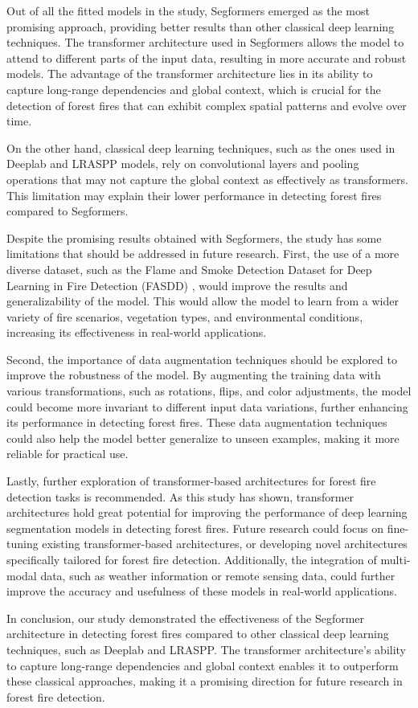 Out of all the fitted models in the study, Segformers \cite{xie_segformer_2021} emerged as the most promising approach, providing better results than other classical deep learning techniques. The transformer architecture used in Segformers allows the model to attend to different parts of the input data, resulting in more accurate and robust models. The advantage of the transformer architecture lies in its ability to capture long-range dependencies and global context, which is crucial for the detection of forest fires that can exhibit complex spatial patterns and evolve over time.

On the other hand, classical deep learning techniques, such as the ones used in Deeplab \cite{chen_rethinking_2017} and LRASPP \cite{howard2019searching} models, rely on convolutional layers and pooling operations that may not capture the global context as effectively as transformers. This limitation may explain their lower performance in detecting forest fires compared to Segformers.

Despite the promising results obtained with Segformers, the study has some limitations that should be addressed in future research. First, the use of a more diverse dataset, such as the Flame and Smoke Detection Dataset for Deep Learning in Fire Detection (FASDD) \cite{wang_fasdd_2022}, would improve the results and generalizability of the model. This would allow the model to learn from a wider variety of fire scenarios, vegetation types, and environmental conditions, increasing its effectiveness in real-world applications.

Second, the importance of data augmentation techniques should be explored to improve the robustness of the model. By augmenting the training data with various transformations, such as rotations, flips, and color adjustments, the model could become more invariant to different input data variations, further enhancing its performance in detecting forest fires. These data augmentation techniques could also help the model better generalize to unseen examples, making it more reliable for practical use.

Lastly, further exploration of transformer-based architectures for forest fire detection tasks is recommended. As this study has shown, transformer architectures hold great potential for improving the performance of deep learning segmentation models in detecting forest fires. Future research could focus on fine-tuning existing transformer-based architectures, or developing novel architectures specifically tailored for forest fire detection. Additionally, the integration of multi-modal data, such as weather information or remote sensing data, could further improve the accuracy and usefulness of these models in real-world applications.

In conclusion, our study demonstrated the effectiveness of the Segformer architecture in detecting forest fires compared to other classical deep learning techniques, such as Deeplab and LRASPP. The transformer architecture's ability to capture long-range dependencies and global context enables it to outperform these classical approaches, making it a promising direction for future research in forest fire detection.
